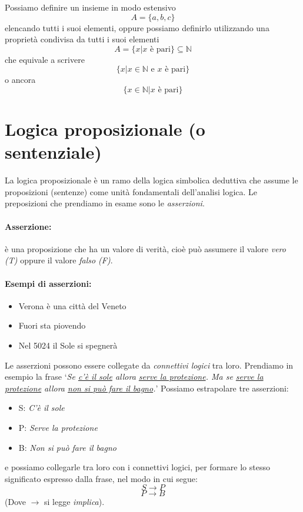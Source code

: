 \documentclass[a4paper,12pt]{report}
\begin{document}
Possiamo definire un insieme in modo estensivo
\[ A = \{a, b, c\} \]
elencando tutti i suoi elementi, oppure possiamo definirlo utilizzando una propriet\`{a} condivisa da tutti i suoi elementi
\[ A = \{x | x \text{ \`{e} pari}\} \subseteq \mathbb{N} \]
che equivale a scrivere
\[ \{x | x \in \mathbb{N} \text{ e $x$ \`{e} pari}\} \]
o ancora
\[ \{x \in \mathbb{N} | x \text{ \`{e} pari}\} \]

\section{Logica proposizionale (o sentenziale)}

La logica proposizionale \`{e} un ramo della logica simbolica deduttiva che assume le proposizioni (sentenze) come unit\`{a} fondamentali dell'analisi logica. Le preposizioni che prendiamo in esame sono le \emph{asserzioni}.

\paragraph{Asserzione:} \`{e} una proposizione che ha un valore di verit\`{a}, cio\`{e} pu\`{o} assumere il valore \emph{vero (T)} oppure il valore \emph{falso (F)}.

\paragraph{Esempi di asserzioni:}
\begin{itemize}
\item Verona \`{e} una citt\`{a} del Veneto
\item Fuori sta piovendo
\item Nel 5024 il Sole si spegner\`{a}
\end{itemize}

Le asserzioni possono essere collegate da \emph{connettivi logici} tra loro. Prendiamo in esempio la frase `\emph{Se \underline{c'\`{e} il sole} allora \underline{serve la protezione}. Ma se \underline{serve la protezione} allora
\underline{non si pu\`{o} fare il bagno}.}'
Possiamo estrapolare tre asserzioni:
\begin{itemize}
\item S: \emph{C'\`{e} il sole}
\item P: \emph{Serve la protezione}
\item B: \emph{Non si pu\`{o} fare il bagno}
\end{itemize}
e possiamo collegarle tra loro con i connettivi logici, per formare lo stesso significato espresso dalla frase, nel modo in cui segue:
\[ S \rightarrow P \]
\[ P \rightarrow B \]
(Dove $\rightarrow$ si legge \emph{implica}).
\end{document}
